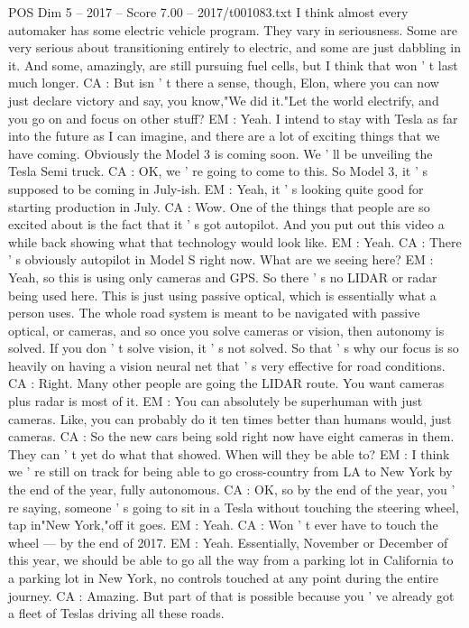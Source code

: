 \begin{textsample}{POS Dim 5 – 2017 – Score 7.00 – 2017/t001083.txt}
I think almost every automaker has some electric vehicle program.
They vary in seriousness.
Some are very serious about transitioning entirely to electric, and some are just dabbling in it.
And some, amazingly, are still pursuing fuel cells, but I think that won ' t last much longer.
CA : But isn ' t there a sense, though, Elon, where you can now just declare victory and say, you know,"We did it."Let the world electrify, and you go on and focus on other stuff?
EM : Yeah.
I intend to stay with Tesla as far into the future as I can imagine, and there are a lot of exciting things that we have coming.
Obviously the Model 3 is coming soon.
We ' ll be unveiling the Tesla Semi truck.
CA : OK, we ' re going to come to this.
So Model 3, it ' s supposed to be coming in July-ish.
EM : Yeah, it ' s looking quite good for starting production in July.
CA : Wow.
One of the things that people are so excited about is the fact that it ' s got autopilot.
And you put out this video a while back showing what that technology would look like.
EM : Yeah.
CA : There ' s obviously autopilot in Model S right now.
What are we seeing here?
EM : Yeah, so this is using only cameras and GPS.
So there ' s no LIDAR or radar being used here.
This is just using passive optical, which is essentially what a person uses.
The whole road system is meant to be navigated with passive optical, or cameras, and so once you solve cameras or vision, then autonomy is solved.
If you don ' t solve vision, it ' s not solved.
So that ' s why our focus is so heavily on having a vision neural net that ' s very effective for road conditions.
CA : Right.
Many other people are going the LIDAR route.
You want cameras plus radar is most of it.
EM : You can absolutely be superhuman with just cameras.
Like, you can probably do it ten times better than humans would, just cameras.
CA : So the new cars being sold right now have eight cameras in them.
They can ' t yet do what that showed.
When will they be able to?
EM : I think we ' re still on track for being able to go cross-country from LA to New York by the end of the year, fully autonomous.
CA : OK, so by the end of the year, you ' re saying, someone ' s going to sit in a Tesla without touching the steering wheel, tap in"New York,"off it goes.
EM : Yeah.
CA : Won ' t ever have to touch the wheel — by the end of 2017.
EM : Yeah.
Essentially, November or December of this year, we should be able to go all the way from a parking lot in California to a parking lot in New York, no controls touched at any point during the entire journey.
CA : Amazing.
But part of that is possible because you ' ve already got a fleet of Teslas driving all these roads.

\end{textsample}
